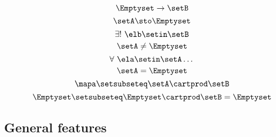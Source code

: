 \begin{forslides}
    \begin{equation}
        \label{eq:slides_session2_114}
        \Emptyset \to \setB
    \end{equation}
    \begin{equation}
        \label{eq:slides_session2_115}
        \setA \sto \Emptyset
    \end{equation}
    \begin{equation}
        \label{eq:slides_session2_116}
        \exists ! \ \elb \setin\setB
    \end{equation}
    \begin{equation}
        \label{eq:slides_session2_117}
        \setA \neq \Emptyset
    \end{equation}
    \begin{equation}
        \label{eq:slides_session2_118}
        \forall \ \ela \setin\setA \dots
    \end{equation}
    \begin{equation}
        \label{eq:slides_session2_119}
        \setA = \Emptyset
    \end{equation}
    \begin{equation}
        \label{eq:slides_session2_120}
        \mapa \setsubseteq \setA \cartprod \setB
    \end{equation}
    \begin{equation}
        \label{eq:slides_session2_121}
        \Emptyset \setsubseteq \Emptyset \cartprod \setB = \Emptyset
    \end{equation}

    \subsection{General features}


\end{forslides}
